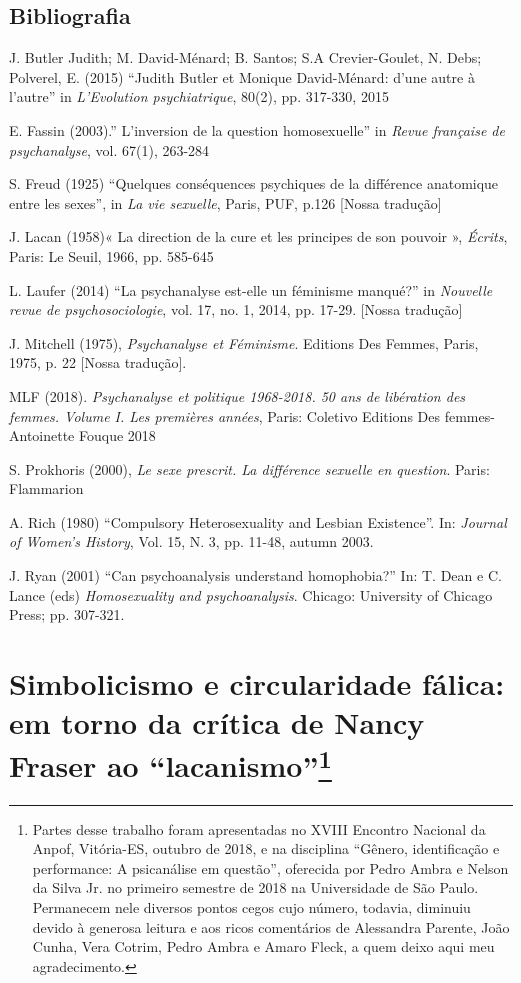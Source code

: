 \section{Bibliografia}

J. Butler Judith; M. David-Ménard; B. Santos; S.A Crevier-Goulet, N.
Debs; Polverel, E. (2015) ``Judith Butler et Monique David-Ménard: d'une
autre à l'autre'' in \emph{L'Evolution psychiatrique}, 80(2), pp.
317-330, 2015

E. Fassin (2003).'' L'inversion de la question homosexuelle'' in
\emph{Revue française de psychanalyse}, vol. 67(1), 263-284

S. Freud (1925) ``Quelques conséquences psychiques de la différence
anatomique entre les sexes'', in \emph{La vie sexuelle}, Paris, PUF,
p.126 {[}Nossa tradução{]}

J. Lacan (1958)« La direction de la cure et les principes de son pouvoir
», \emph{Écrits}, Paris: Le Seuil, 1966, pp. 585-645

L. Laufer (2014) ``La psychanalyse est-elle un féminisme manqué?'' in
\emph{Nouvelle revue de psychosociologie}, vol. 17, no. 1, 2014, pp.
17-29. {[}Nossa tradução{]}

J. Mitchell (1975), \emph{Psychanalyse et Féminisme}. Editions Des
Femmes, Paris, 1975, p. 22 {[}Nossa tradução{]}.

MLF (2018). \emph{Psychanalyse et politique 1968-2018. 50 ans de
libération des femmes. Volume I. Les premières années}, Paris:
Coletivo Editions Des femmes-Antoinette Fouque 2018

S. Prokhoris (2000), \emph{Le sexe prescrit. La différence sexuelle en
question}. Paris: Flammarion

A. Rich (1980) ``Compulsory Heterosexuality and Lesbian Existence''.  In:
\emph{Journal of Women's History}, Vol. 15, N. 3, pp. 11-48, autumn
2003.

J. Ryan (2001) ``Can psychoanalysis understand homophobia?'' In: T. Dean
e C. Lance (eds) \emph{Homosexuality and psychoanalysis}. Chicago:
University of Chicago Press; pp. 307-321.



\chapter*{Simbolicismo e circularidade fálica: em torno da crítica de
Nancy Fraser ao ``lacanismo''\footnote{Partes desse trabalho foram
  apresentadas no XVIII Encontro Nacional da Anpof, Vitória-ES, outubro
  de 2018, e na disciplina ``Gênero, identificação e performance: A
  psicanálise em questão'', oferecida por Pedro Ambra e Nelson da Silva
  Jr. no primeiro semestre de 2018 na Universidade de São Paulo.
  Permanecem nele diversos pontos cegos cujo número, todavia, diminuiu
  devido à generosa leitura e aos ricos comentários de Alessandra
  Parente, João Cunha, Vera Cotrim, Pedro Ambra e Amaro Fleck, a quem
  deixo aqui meu agradecimento.}}

